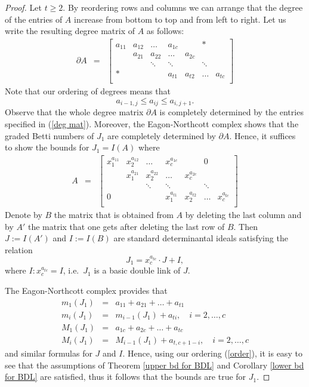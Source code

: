 \documentclass[12pt,twoside]{amsart}
\numberwithin{equation}{section}
\theoremstyle{definition}
\begin{document}
\begin{proof}
Let $t \geq 2$. By reordering rows and columns we can arrange that the degree of the
entries of  $A$ increase from bottom to top and from left to right. Let us write the
resulting degree matrix of $A$ as follows:
\begin{eqnarray} \label{deg mat}
\partial A & = & \begin{bmatrix}
a_{1 1} & a_{1 2} & \ldots & a_{1 c} & & *\\
& a_{2 1} & a_{2 2} & \ldots & a_{2 c} & & \\
& & \ddots & \ddots &  &  \ddots\\
* & & & a_{t 1} & a_{t 2} & \ldots & a_{t c} \\
\end{bmatrix}
\end{eqnarray}
Note that our ordering of degrees means that
\begin{equation} \label{order}
a_{i-1, j}\leq a_{i j} \leq a_{i, j+1}.
\end{equation}
Observe that the whole degree matrix $\partial A$ is completely determined by the entries
specified in (\ref{deg mat}). Moreover, the Eagon-Northcott complex shows that the graded
Betti numbers of $J_1$ are completely determined by $\partial A$. Hence, it suffices to
show the bounds for $J_1 = I(A)$ where
\begin{eqnarray} \label{mon-mat}
A & = & \begin{bmatrix}
x_1^{a_{1 1}} & x_2^{a_{1 2}} & \ldots & x_c^{a_{1 c}} & & 0\\
& x_1^{a_{2 1}} & x_2^{a_{2 2}} & \ldots & x_c^{a_{2 c}} & & \\
& & \ddots & \ddots &  &  \ddots\\
0 & & & x_1^{a_{t 1}} & x_2^{a_{t 2}} & \ldots & x_c^{a_{t c}} \\
\end{bmatrix}
\end{eqnarray}
Denote by $B$ the matrix that is obtained from $A$ by deleting the last column and by
$A'$ the matrix that one gets after deleting the last row of $B$. Then $J := I(A')$ and
$I := I(B)$ are standard determinantal ideals satisfying the relation
$$
J_1 = x_c^{a_{t c}} \cdot J + I,
$$
where $I : x_c^{a_{t c}} = I$, i.e.\ $J_1$ is a basic double link of $J$.

The Eagon-Northcott complex provides that
\begin{eqnarray*}
m_1 (J_1) & = & a_{1 1} + a_{2 1} + \ldots + a_{t 1} \\
m_i (J_1) & = & m_{i-1} (J_1) + a_{t i}, \quad i = 2,\ldots,c \\
M_1(J_1) & = & a_{1 c} + a_{2 c} + \ldots + a_{t c} \\
M_i (J_1) & = & M_{i-1} (J_1) + a_{t, c+1-i}, \quad i = 2,\ldots,c
\end{eqnarray*}
and similar formulas for $J$ and $I$. Hence, using our ordering (\ref{order}), it is easy
to see that the assumptions of Theorem \ref{upper bd for BDL} and Corollary  \ref{lower
bd for BDL} are satisfied, thus it follows that the bounds are true for $J_1$.


\end{proof}
\end{document}
